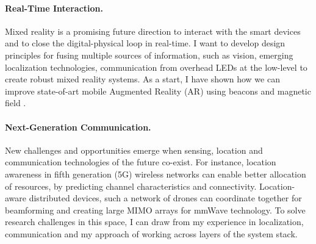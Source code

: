 \documentclass[10pt]{article}
\begin{document}
\paragraph{Real-Time Interaction. }
Mixed reality is a promising future direction to interact with the smart devices and to close the digital-physical loop in real-time. 
I want to develop design principles for fusing multiple sources of information, such as vision, emerging localization technologies, communication from overhead LEDs at the low-level to create robust mixed reality systems. As a start, I have shown how we can improve state-of-art mobile Augmented Reality (AR) using beacons and magnetic field \cite{mobileAR}. %

\paragraph{Next-Generation Communication. }
New challenges and opportunities emerge when sensing, location and communication technologies of the future co-exist. For instance, location awareness in fifth generation (5G) wireless networks can enable better allocation of resources, by predicting channel characteristics and connectivity. Location-aware distributed devices, such a network of drones can coordinate together for beamforming and creating large MIMO arrays for mmWave technology. To solve research challenges in this space, I can draw from my experience in localization, communication and my approach of working across layers of the system stack. \\

\end{document}

